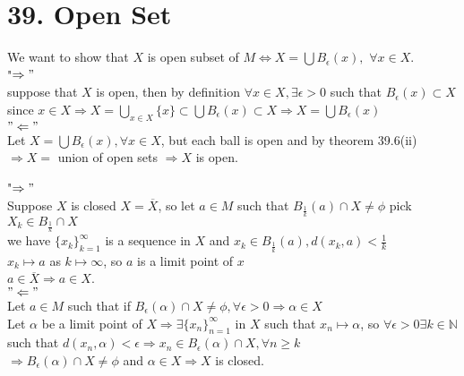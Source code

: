 \documentclass{book}
\begin{document}
\section{39. Open Set}

\begin{tcolorbox}[enhanced,attach boxed title to top center={yshift=-3mm,yshifttext=-1mm},
colback=blue!5!white,colframe=blue!75!black,colbacktitle=red!80!black,
title={Exercise 39.9::},fonttitle=\bfseries,
boxed title style={size=small,colframe=red!50!black} ]
{\color{red}{Proof:}}We want to show that $X$ is open subset of $M\iff X=\bigcup B_\epsilon(x),$ $\forall x\in 
X$.\\
{\color{red} "$\Rightarrow"$}\\
suppose that $X$ is open, then by definition $\forall x\in X,\exists\epsilon>0$ such that 
$B_\epsilon(x)\subset X$\\
since $x\in X\Rightarrow X=\bigcup_{x\in X} \{x\}\subset\bigcup B_\epsilon(x)\subset X\Longrightarrow 
X=\bigcup B_\epsilon(x)$\\
{\color{red}$"\Leftarrow"$}\\
Let $ X=\bigcup B_\epsilon(x),\forall x\in X$, but each ball is open and by theorem 39.6(ii)\\
$\Rightarrow X=$ union of open sets $\Rightarrow X$ is open.
\end{tcolorbox}

\begin{tcolorbox}[enhanced,attach boxed title to top center={yshift=-3mm,yshifttext=-1mm},
colback=blue!5!white,colframe=blue!75!black,colbacktitle=red!80!black,
title={Exercise 39.10:},fonttitle=\bfseries,
boxed title style={size=small,colframe=red!50!black} ]
{\color{red}{Proof:}}  
{\color{red} "$\Rightarrow"$}\\
Suppose $X$ is closed $X=\overline{X}$, so let $a\in M$ such that $B_\frac{1}{k}(a)\cap X\neq\phi$ pick $X_k\in 
B_\frac{1}{k}\cap X$\\
we have $\{x_k\}_{k=1}^\infty$ is a sequence in $X$ and $x_k\in B_\frac{1}{k}(a),d(x_k,a)<\frac{1}{k}$\\
$x_k\mapsto a$ as $k\mapsto\infty$, so $a$ is a limit point of $x$\\
$a\in\overline{X}\Rightarrow a\in X$.\\
{\color{red}$"\Leftarrow"$}\\
Let $a\in M$ such that if $B_\epsilon(\alpha)\cap X\neq \phi,\forall \epsilon>0\Rightarrow \alpha\in X$\\
Let $\alpha$ be a limit point of $X\Rightarrow\exists\{x_n\}_{n=1}^\infty$ in $X$ such that $x_n\mapsto\alpha$, 
so $\forall\epsilon>0\exists k\in\mathbb{N}$ such that $d(x_n,\alpha)<\epsilon\Rightarrow x_n\in 
B_\epsilon(\alpha)\cap X,\forall n\geq k$\\
$\Rightarrow B_\epsilon(\alpha)\cap X\neq \phi$ and $\alpha\in X\Rightarrow X$ is closed.
\end{tcolorbox}
\end{document}
